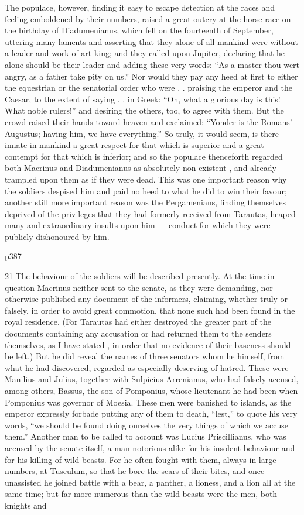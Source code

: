 The populace, however, finding it easy to escape detection at the races and feeling emboldened by their numbers, raised a great outcry at the horse-race on the birthday of Diadumenianus, which fell on the fourteenth of September, uttering many laments and asserting that they alone of all mankind were without a leader and work of art king; and they called upon Jupiter, declaring that he alone should be their leader and adding these very words: ``As a master thou wert angry, as a father take pity on us.'' Nor would they pay any heed at first to either the equestrian or the senatorial order who were . . praising the emperor and the Caesar, to the extent of saying . . in Greek: ``Oh, what a glorious day is this! What noble rulers!'' and desiring the others, too, to agree with them. But the crowd raised their hands toward heaven and exclaimed: ``Yonder is the Romans' Augustus; having him, we have everything.'' So truly, it would seem, is there innate in mankind a great respect for that which is superior and a great contempt for that which is inferior; and so the populace thenceforth regarded both Macrinus and Diadumenianus as absolutely non-existent , and already trampled upon them as if they were dead. This was one important reason why the soldiers despised him and paid no heed to what he did to win their favour; another still more important reason was the Pergamenians, finding themselves deprived of the privileges that they had formerly received from Tarautas, heaped many and extraordinary insults upon him \texthebrew{—} conduct for which they were publicly dishonoured by him.

p387

21
The behaviour of the soldiers will be described presently. At the time in question Macrinus neither sent to the senate, as they were demanding, nor otherwise published any document of the informers, claiming, whether truly or falsely, in order to avoid great commotion, that none such had been found in the royal residence. (For Tarautas had either destroyed the greater part of the documents containing any accusation or had returned them to the senders themselves, as I have stated , in order that no evidence of their baseness should be left.) But he did reveal the names of three senators whom he himself, from what he had discovered, regarded as especially deserving of hatred. These were Manilius and Julius, together with Sulpicius Arrenianus, who had falsely accused, among others, Bassus, the son of Pomponius, whose lieutenant he had been when Pomponius was governor of Moesia. These men were banished to islands, as the emperor expressly forbade putting any of them to death, ``lest,'' to quote his very words, ``we should be found doing ourselves the very things of which we accuse them.'' Another man to be called to account was Lucius Priscillianus, who was accused by the senate itself, a man notorious alike for his insolent behaviour and for his killing of wild beasts. For he often fought with them, always in large numbers, at Tusculum, so that he bore the scars of their bites, and once unassisted he joined battle with a bear, a panther, a lioness, and a lion all at the same time; but far more numerous than the wild beasts were the men, both knights and


